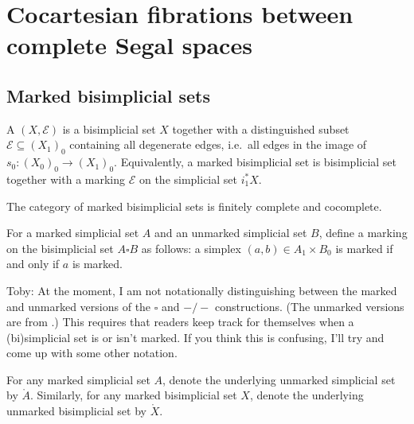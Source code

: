 \documentclass[main.tex]{subfiles}
\begin{document}
\section{Cocartesian fibrations between complete Segal spaces}
\label{sec:cocartesian_fibrations_between_complete_segal_spaces}

\subsection{Marked bisimplicial sets}
\label{ssc:marked_bisimplicial_sets}

\begin{definition}
  A  $(X, \mathcal{E})$ is a bisimplicial set $X$ together with a distinguished subset $\mathcal{E} \subseteq (X_{1})_{0}$ containing all degenerate edges, i.e.\ all edges in the image of $s_{0}\colon (X_{0})_{0} \to (X_{1})_{0}$. Equivalently, a marked bisimplicial set is bisimplicial set together with a marking $\mathcal{E}$ on the simplicial set $i^{*}_{1}X$.
\end{definition}

The category of marked bisimplicial sets is finitely complete and cocomplete.

\begin{definition}
  For a marked simplicial set $A$ and an unmarked simplicial set $B$, define a marking on the bisimplicial set $A \square B$ as follows: a simplex $(a, b) \in A_{1} \times B_{0}$ is marked if and only if $a$ is marked.
\end{definition}

\begin{note}
  Toby: At the moment, I am not notationally distinguishing between the marked and unmarked versions of the $\square$ and $-/-$ constructions. (The unmarked versions are from \cite{qcats_vs_segal_spaces}.) This requires that readers keep track for themselves when a (bi)simplicial set is or isn't marked. If you think this is confusing, I'll try and come up with some other notation.
\end{note}

For any marked simplicial set $A$, denote the underlying unmarked simplicial set by $\mathring{A}$. Similarly, for any marked bisimplicial set $X$, denote the underlying unmarked bisimplicial set by $\mathring{X}$.
\end{document}
